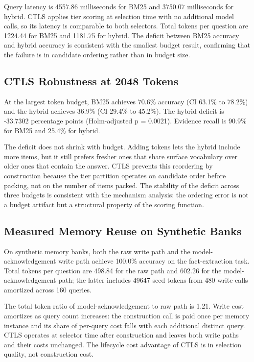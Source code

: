 Query latency is 4557.86 milliseconds for BM25 and 3750.07 milliseconds for hybrid. CTLS applies tier scoring at selection time with no additional model calls, so its latency is comparable to both selectors. Total tokens per question are 1224.44 for BM25 and 1181.75 for hybrid. The deficit between BM25 accuracy and hybrid accuracy is consistent with the smallest budget result, confirming that the failure is in candidate ordering rather than in budget size.

\subsection{CTLS Robustness at 2048 Tokens}

\label{sec:result_protocol_replication}

At the largest token budget, BM25 achieves 70.6\% accuracy (CI 63.1\% to 78.2\%) and the hybrid achieves 36.9\% (CI 29.4\% to 45.2\%). The hybrid deficit is -33.7302 percentage points (Holm-adjusted p = 0.0021). Evidence recall is 90.9\% for BM25 and 25.4\% for hybrid.

The deficit does not shrink with budget. Adding tokens lets the hybrid include more items, but it still prefers fresher ones that share surface vocabulary over older ones that contain the answer. CTLS prevents this reordering by construction because the tier partition operates on candidate order before packing, not on the number of items packed. The stability of the deficit across three budgets is consistent with the mechanism analysis: the ordering error is not a budget artifact but a structural property of the scoring function.

\subsection{Measured Memory Reuse on Synthetic Banks}

\label{sec:result_memory_reuse}

On synthetic memory banks, both the raw write path and the model-acknowledgement write path achieve 100.0\% accuracy on the fact-extraction task. Total tokens per question are 498.84 for the raw path and 602.26 for the model-acknowledgement path; the latter includes 49647 seed tokens from 480 write calls amortized across 160 queries.

The total token ratio of model-acknowledgement to raw path is 1.21. Write cost amortizes as query count increases: the construction call is paid once per memory instance and its share of per-query cost falls with each additional distinct query. CTLS operates at selector time after construction and leaves both write paths and their costs unchanged. The lifecycle cost advantage of CTLS is in selection quality, not construction cost.

